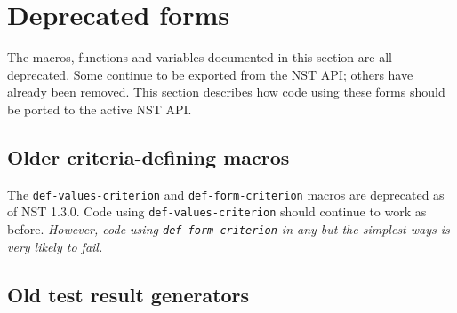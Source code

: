 
\section{Deprecated forms}
The macros, functions and variables documented in this section are all
deprecated.  Some continue to be exported from the NST API; others
have already been removed.  This section describes how code using
these forms should be ported to the active NST API.

\subsection{Older criteria-defining macros}
\label{sec:def-values-criterion}
\label{sec:def-form-criterion}
The \texttt{def-values-criterion} and \texttt{def-form-criterion}
macros are deprecated as of NST 1.3.0.  Code using \texttt{def-values-criterion} should continue to
work as before.  \emph{However, code using \texttt{def-form-criterion} in any but the simplest ways is very likely to fail.}
%



\subsection{Old test result generators}





